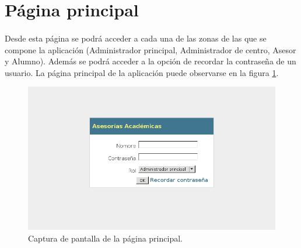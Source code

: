 \section{Página principal}

  \paragraph{}Desde esta página se podrá acceder a cada una de las zonas de las
  que se compone la aplicación (Administrador principal, Administrador de
  centro, Asesor y Alumno). Además se podrá acceder a la opción de recordar la
  contraseña de un usuario. La página principal de la aplicación puede
  observarse en la figura \ref{capturaPaginaPrincipal}.

  \begin{figure}[!ht]
    \begin{center}
      \includegraphics[scale=0.55]{12.Disenyo_Interfaz/12.2.Pagina_Principal/pagina_principal.png}
      \caption{Captura de pantalla de la página principal.}
      \label{capturaPaginaPrincipal}
    \end{center}
  \end{figure}
